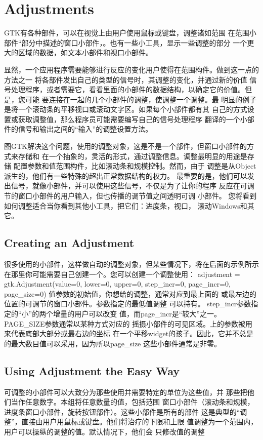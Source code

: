 \chapter{Adjustments}
GTK有各种部件，可以在视觉上由用户使用鼠标或键盘，调整诸如范围
在范围小部件“部分中描述的窗口小部件，。也有一些小工具，显示一些调整的部分
一个更大的区域的数据，如文本小部件和视口小部件。

显然，一个应用程序需要能够进行反应的变化用户使得在范围构件。做到这一点的方法之一
将各部件发出自己的类型的信号时，其调整的变化，并通过新的价值
信号处理程序，或者需要它，看看里面的小部件的数据结构，以确定它的价值。但是，您可能
要连接在一起的几个小部件的调整，使调整一个调整。最
明显的例子是将一个滚动条的平移视口或滚动文字区。如果每个小部件都有其
自己的方式设置或获取调整值，那么程序员可能需要编写自己的信号处理程序
翻译的一个小部件的信号和输出之间的“输入”的调整设置方法。

图GTK解决这个问题，使用的调整对象，这是不是一个部件，但窗口小部件的方式来存储和
在一个抽象的，灵活的形式，通过调整信息。调整最明显的用途是存储
配置参数和值范围构件，比如滚动条和规模控制。然而，由于
调整是从Object派生的，他们有一些特殊的超出正常数据结构的权力。
最重要的是，他们可以发出信号，就像小部件，并可以使用这些信号，不仅是为了让你的程序
反应在可调节的窗口小部件的用户输入，但也传播的调节值之间透明可调
小部件。
您将看到如何调整适合当你看到其他小工具，把它们：进度条，视口，
滚动Windows和其它。	
\section{Creating an Adjustment}
很多使用的小部件，这样做自动的调整对象，但某些情况下，将在后面的示例所示
在那里你可能需要自己创建一个。您可以创建一个调整使用：
adjustment = gtk.Adjustment(value=0, lower=0, upper=0, step_incr=0,
	page_incr=0, page_size=0)
值参数的初始值，你想给的调整，通常对应到最上面的
或最左边的位置的可调节的窗口小部件。参数指定的最低值调整
可以持有。 step_incr参数指定的“小”的两个增量的用户可以改变
值，而page_incr是“较大”之一。 PAGE_SIZE参数通常以某种方式对应的
摇摄小部件的可见区域。上的参数被用来代表底部大部分或最右边的坐标
在一个平移widget的孩子。因此，它并不总是的最大数目值可以采用，因为所以page_size
这些小部件通常是非零。
\section{Using Adjustment the Easy Way}
可调整的小部件可以大致分为那些使用并需要特定的单位为这些值，并
那些把他们当作任意数字。本组将任意数量的值，包括范围
窗口小部件（滚动条和规模，进度条窗口小部件，旋转按钮部件）。这些小部件是所有的部件
这是典型的“调整”，直接由用户用鼠标或键盘。他们将治疗的下限和上限
值调整为一个范围内，用户可以操纵的调整的值。默认情况下，他们会
只修改值的调整

